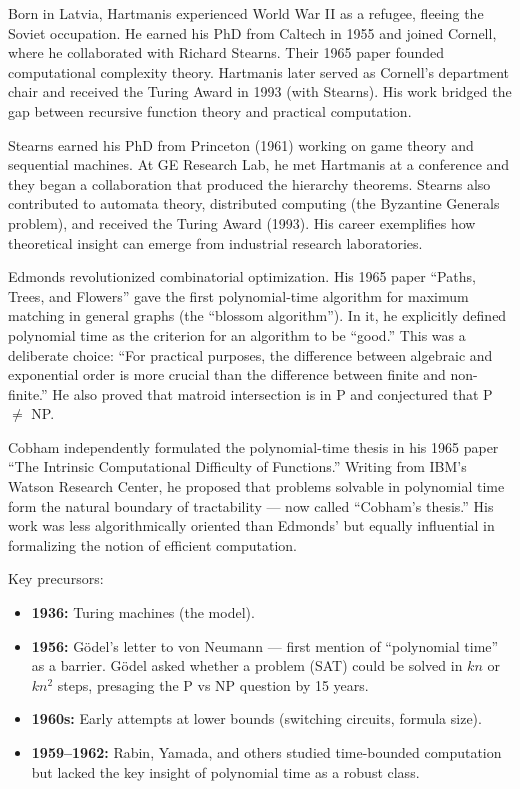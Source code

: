 Born in Latvia, Hartmanis experienced World War II as a refugee, fleeing the Soviet occupation. He earned his PhD from Caltech in 1955 and joined Cornell, where he collaborated with Richard Stearns. Their 1965 paper founded computational complexity theory. Hartmanis later served as Cornell's department chair and received the Turing Award in 1993 (with Stearns). His work bridged the gap between recursive function theory and practical computation.

Stearns earned his PhD from Princeton (1961) working on game theory and sequential machines. At GE Research Lab, he met Hartmanis at a conference and they began a collaboration that produced the hierarchy theorems. Stearns also contributed to automata theory, distributed computing (the Byzantine Generals problem), and received the Turing Award (1993). His career exemplifies how theoretical insight can emerge from industrial research laboratories.

Edmonds revolutionized combinatorial optimization. His 1965 paper ``Paths, Trees, and Flowers'' gave the first polynomial-time algorithm for maximum matching in general graphs (the ``blossom algorithm''). In it, he explicitly defined polynomial time as the criterion for an algorithm to be ``good.'' This was a deliberate choice: ``For practical purposes, the difference between algebraic and exponential order is more crucial than the difference between finite and non-finite.'' He also proved that matroid intersection is in P and conjectured that P $\neq$ NP.

Cobham independently formulated the polynomial-time thesis in his 1965 paper ``The Intrinsic Computational Difficulty of Functions.'' Writing from IBM's Watson Research Center, he proposed that problems solvable in polynomial time form the natural boundary of tractability — now called ``Cobham's thesis.'' His work was less algorithmically oriented than Edmonds' but equally influential in formalizing the notion of efficient computation.

Key precursors:
\begin{itemize}
\item \textbf{1936:} Turing machines (the model).
\item \textbf{1956:} G\"odel's letter to von Neumann — first mention of ``polynomial time'' as a barrier. G\"odel asked whether a problem (SAT) could be solved in $kn$ or $kn^2$ steps, presaging the P vs NP question by 15 years.
\item \textbf{1960s:} Early attempts at lower bounds (switching circuits, formula size).
\item \textbf{1959--1962:} Rabin, Yamada, and others studied time-bounded computation but lacked the key insight of polynomial time as a robust class.
\end{itemize}

